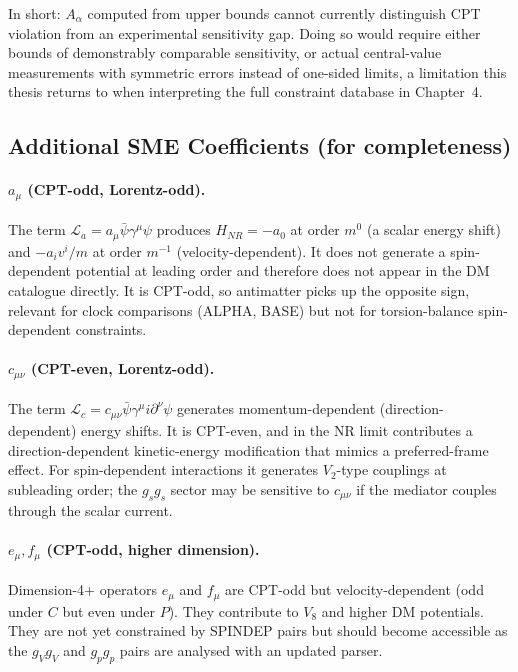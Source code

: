 \documentclass[main]{subfiles}
\begin{document}
In short: $A_\alpha$ computed from upper bounds cannot currently distinguish
CPT violation from an experimental sensitivity gap. Doing so would require
either bounds of demonstrably comparable sensitivity, or actual
central-value measurements with symmetric errors instead of one-sided
limits, a limitation this thesis returns to when interpreting the full
constraint database in Chapter~4.

\subsection{Additional SME Coefficients (for completeness)}

\paragraph{$a_\mu$ (CPT-odd, Lorentz-odd).} The term
$\mathcal L_a=a_\mu\bar\psi\gamma^\mu\psi$ produces $H_{NR}=-a_0$ at order
$m^0$ (a scalar energy shift) and $-a_iv^i/m$ at order $m^{-1}$
(velocity-dependent). It does not generate a spin-dependent potential at
leading order and therefore does not appear in the DM catalogue directly. It
is CPT-odd, so antimatter picks up the opposite sign, relevant for clock
comparisons (ALPHA, BASE) but not for torsion-balance spin-dependent
constraints.

\paragraph{$c_{\mu\nu}$ (CPT-even, Lorentz-odd).} The term
$\mathcal L_c=c_{\mu\nu}\bar\psi\gamma^\mu i\partial^\nu\psi$ generates
momentum-dependent (direction-dependent) energy shifts. It is CPT-even, and
in the NR limit contributes a direction-dependent kinetic-energy
modification that mimics a preferred-frame effect. For spin-dependent
interactions it generates $V_2$-type couplings at subleading order; the
$g_sg_s$ sector may be sensitive to $c_{\mu\nu}$ if the mediator couples
through the scalar current.

\paragraph{$e_\mu, f_\mu$ (CPT-odd, higher dimension).} Dimension-4+
operators $e_\mu$ and $f_\mu$ are CPT-odd but velocity-dependent (odd under
$C$ but even under $P$). They contribute to $V_8$ and higher DM potentials.
They are not yet constrained by SPINDEP pairs but should become accessible
as the $g_Vg_V$ and $g_pg_p$ pairs are analysed with an updated parser.
\end{document}
